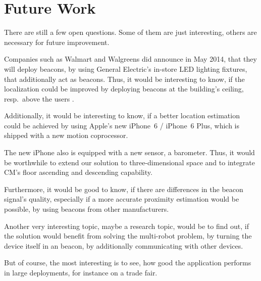 \section{Future Work} \label{sec:future}
There are still a few open questions. Some of them are just interesting, others are necessary for future improvement.

Companies such as Walmart and Walgreens did announce in May 2014, that they will deploy beacons, by using General Electric's in-store LED lighting fixtures, that additionally act as beacons. Thus, it would be interesting to know, if the localization could be improved by deploying beacons at the building's ceiling, resp.\ above the users \citep{9to5mac}.

Additionally, it would be interesting to know, if a better location estimation could be achieved by using Apple's new iPhone~6 / iPhone~6 Plus, which is shipped with a new motion coprocessor.

The new iPhone also is equipped with a new sensor, a barometer. Thus, it would be worthwhile to extend our solution to three-dimensional space and to integrate \acl{CM}'s floor ascending and descending capability.

Furthermore, it would be good to know, if there are differences in the beacon signal's quality, especially if a more accurate proximity estimation would be possible, by using beacons from other manufacturers.

Another very interesting topic, maybe a research topic, would be to find out, if the solution would benefit from solving the multi-robot problem, by turning the device itself in an beacon, by additionally communicating with other devices.

But of course, the most interesting is to see, how good the application performs in large deployments, for instance on a trade fair.


